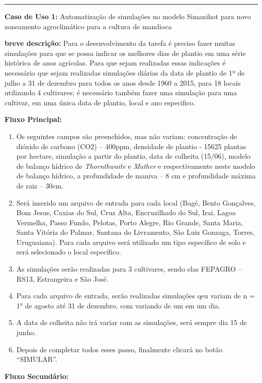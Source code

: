 \documentclass[tg]{mdtufsm}
\begin{document}

	\hrule \bigskip

	{\bf Caso de Uso 1:} Automatização de simulações no modelo Simanihot para novo zoneamento agroclimático para a cultura de mandioca 
	\bigskip
	
	{\bf breve descrição:} Para o desenvolvimento da tarefa é preciso fazer muitas simulações para que se possa indicar os melhores dias de plantio em uma série histórica de anos agrícolas. Para que sejam realizadas essas indicações é necessário que sejam realizadas simulações diárias da data de plantio de 1º de julho a 31 de dezembro para todos os anos desde 1960 a 2015, para 18 locais utilizando 4 cultivares; é necessário também fazer uma simulação para uma cultivar, em uma única data de plantio, local e ano especifico. 
	\bigskip
	
	{\bf Fluxo Principal:}
	
	\begin{enumerate}
		\item Os seguintes campos são preenchidos, mas não variam: concentração de dióxido de carbono (CO2) – 400ppm, densidade de plantio - 15625 plantas por hectare, simulação a partir do plantio, data de colheita (15/06), modelo de balanço hídrico de \emph{Thornthwaite} e \emph{Mather} e respectivamente neste modelo de balanço hídrico, a profundidade de maniva – 8 cm e profundidade máxima de raiz – 30cm.
		\item Será inserido um arquivo de entrada para cada local (Bagé, Bento Gonçalves, Bom Jesus, Caxias do Sul, Cruz Alta, Encruzilhado do Sul, Irai, Lagoa Vermelha, Passo Fundo, Pelotas, Porto Alegre, Rio Grande, Santa Maria, Santa Vitória do Palmar, Santana do Livramento, São Luiz Gonzaga, Torres, Uruguaiana). Para cada arquivo será utilizado um tipo específico de solo e será selecionado o local específico.
		\item As simulações serão realizadas para 3 cultivares, sendo elas FEPAGRO – RS13, Estrangeira e São José. 
		\item Para cada arquivo de entrada, serão realizadas simulações qeu variam de n = 1° de agosto até 31 de dezembro, com variando de um em um dia.
		\item A data de colheita não irá variar com as simulações, será sempre dia 15 de junho.
		\item Depois de completar todos esses passo, finalmente clicará no botão “SIMULAR”. 
	\end{enumerate}
	
	{\bf Fluxo Secundário:}
	
\end{document}
